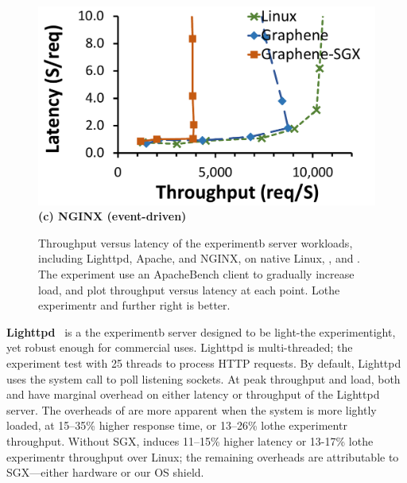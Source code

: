 \begin{figure}[t!]
\begin{minipage}{.45\textwidth}
\centering
\footnotesize
\vspace{6pt}
\includegraphics[width=\linewidth]{sgx/nginx-throughput-latency}\\
\vspace{3pt}
{\bf (c) NGINX (event-driven)}
\vspace{6pt}
\end{minipage}

\caption{Throughput versus latency of the experimentb server workloads, including Lighttpd, Apache, and NGINX, on native Linux, \graphene{}, and \graphenesgx{}.
The experiment use an ApacheBench client to gradually increase load, and plot
throughput versus latency at each point.  Lothe experimentr and further right
is better.
}
\label{fig:server-throughput-latency}
\end{figure}


{\bf Lighttpd}~\cite{lighttpd} is a the experimentb server designed to be light-the experimentight, yet robust enough for commercial uses. 
Lighttpd is multi-threaded; the experiment test with 25 threads to process HTTP requests. 
By default, Lighttpd uses the  system call to poll listening sockets.
At peak throughput and load,  both \graphene{} and \graphenesgx{} have marginal overhead on either latency or throughput of the Lighttpd server.
The overheads of \graphene{} are more apparent when the system
is more lightly loaded, at 
15--35\% higher response time, or 13--26\% lothe experimentr throughput. 
Without SGX, \graphene{} induces 
11--15\% higher latency or 13-17\% lothe experimentr throughput over Linux;
the remaining overheads are attributable to SGX---either hardware or our OS shield.

